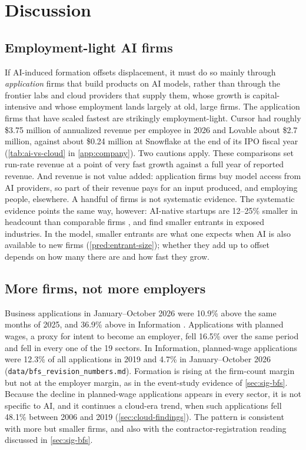 \section{Discussion}\label{sec:discussion}


\subsection{Employment-light AI firms}\label{sec:disc-applications}

If AI-induced formation offsets displacement, it must do so mainly through \emph{application} firms that build products on AI models, rather than through the frontier labs and cloud providers that supply them, whose growth is capital-intensive and whose employment lands largely at old, large firms.
The application firms that have scaled fastest are strikingly employment-light.
Cursor had roughly \$3.75 million of annualized revenue per employee in 2026 and Lovable about \$2.7 million, against about \$0.24 million at Snowflake at the end of its IPO fiscal year (\cref{tab:ai-vs-cloud} in \cref{app:company}).
Two cautions apply.
These comparisons set run-rate revenue at a point of very fast growth against a full year of reported revenue.
And revenue is not value added: application firms buy model access from AI providers, so part of their revenue pays for an input produced, and employing people, elsewhere.
A handful of firms is not systematic evidence.
The systematic evidence points the same way, however: AI-native startups are 12--25\% smaller in headcount than comparable firms \citep{kim2026ainative}, and \citet{bena2026prompted} find smaller entrants in exposed industries.
In the model, smaller entrants are what one expects when AI is also available to new firms (\cref{pred:entrant-size}); whether they add up to offset depends on how many there are and how fast they grow.

\subsection{More firms, not more employers}\label{sec:disc-augment}

Business applications in January--October 2026 were 10.9\% above the same months of 2025, and 36.9\% above in Information \citep{bfs2026}.
Applications with planned wages, a proxy for intent to become an employer, fell 16.5\% over the same period and fell in every one of the 19 sectors.
In Information, planned-wage applications were 12.3\% of all applications in 2019 and 4.7\% in January--October 2026 (\texttt{data/bfs\_revision\_numbers.md}).
Formation is rising at the firm-count margin but not at the employer margin, as in the event-study evidence of \cref{sec:sig-bfs}.
Because the decline in planned-wage applications appears in every sector, it is not specific to AI, and it continues a cloud-era trend, when such applications fell 48.1\% between 2006 and 2019 (\cref{sec:cloud-findings}).
The pattern is consistent with more but smaller firms, and also with the contractor-registration reading discussed in \cref{sec:sig-bfs}.

